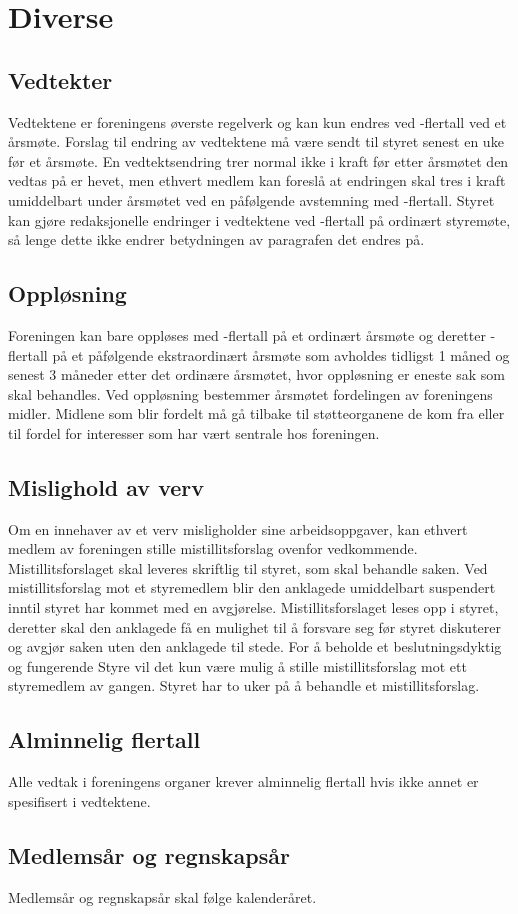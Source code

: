 \chapter{Diverse}

\emptychapterspacing

\section{Vedtekter}
Vedtektene er foreningens øverste regelverk og kan kun endres ved -flertall ved et årsmøte. Forslag til endring av vedtektene må være sendt til styret senest en uke før et årsmøte. En vedtektsendring trer normal ikke i kraft før etter årsmøtet den vedtas på er hevet, men ethvert medlem kan foreslå at endringen skal tres i kraft umiddelbart under årsmøtet ved en påfølgende avstemning med -flertall. Styret kan gjøre redaksjonelle endringer i vedtektene ved -flertall på ordinært styremøte, så lenge dette ikke endrer betydningen av paragrafen det endres på.

\section{Oppløsning}
Foreningen kan bare oppløses med -flertall på et ordinært årsmøte og deretter -flertall på et påfølgende ekstraordinært årsmøte som avholdes tidligst 1 måned og senest 3 måneder etter det ordinære årsmøtet, hvor oppløsning er eneste sak som skal behandles. Ved oppløsning bestemmer årsmøtet fordelingen av foreningens midler. Midlene som blir fordelt må gå tilbake til støtteorganene de kom fra eller til fordel for interesser som har vært sentrale hos foreningen.

\section{Mislighold av verv}
Om en innehaver av et verv misligholder sine arbeidsoppgaver, kan ethvert medlem av foreningen stille mistillitsforslag ovenfor vedkommende. Mistillitsforslaget skal leveres skriftlig til styret, som skal behandle saken. Ved mistillitsforslag mot et styremedlem blir den anklagede umiddelbart suspendert inntil styret har kommet med en avgjørelse. Mistillitsforslaget leses opp i styret, deretter skal den anklagede få en mulighet til å forsvare seg før styret diskuterer og avgjør saken uten den anklagede til stede. For å beholde et beslutningsdyktig og fungerende Styre vil det kun være mulig å stille mistillitsforslag mot ett styremedlem av gangen. Styret har to uker på å behandle et mistillitsforslag.

\section{Alminnelig flertall}
Alle vedtak i foreningens organer krever alminnelig flertall hvis ikke annet er spesifisert i vedtektene.

\section{Medlemsår og regnskapsår}
Medlemsår og regnskapsår skal følge kalenderåret.
